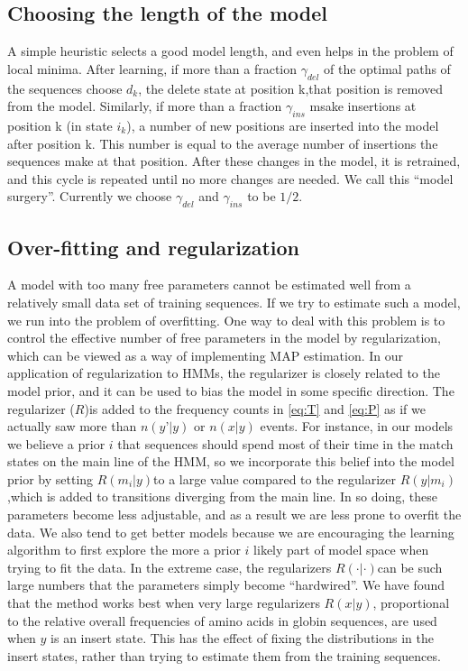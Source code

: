 \subsection{Choosing the length of the model}
A simple heuristic selects a good model length, and even helps in the problem of local minima. 
After learning, if more than a fraction $\gamma_{del}$ of the optimal paths of the sequences choose $d_k$, the delete state at position k,that position is removed from the model. 
Similarly, if more than a fraction $\gamma_{ins}$ msake insertions at position k (in state $i_k$), a number of new positions are inserted into the model after position k. This number is equal to the average number of insertions the sequences make at that position. After these changes in the model, it is retrained, and this cycle is repeated until no more changes are needed. We call this “model surgery”. Currently we choose $\gamma_{del}$ and $\gamma_{ins}$ to be $1/2$.

\subsection{Over-fitting and regularization}
A model with too many free parameters cannot be estimated well from a relatively small data set of training sequences. If we try to estimate such a model, we run into the problem of overfitting.
One way to deal with this problem is to control the effective number of free parameters in the model by regularization, which can be viewed as a way of implementing MAP estimation.
In our application of regularization to HMMs, the regularizer is closely related to the model prior, and it can be used to bias the model in some specific direction. The regularizer ($R$)is added to the frequency counts in \ref{eq:T} and  \ref{eq:P} as if we actually saw more than $n(y’|y)$ or $n(x|y)$ events. 
For instance, in our models we believe a prior $i$ that sequences should spend most of their time in the match states on the main line of the HMM, so we incorporate this belief into the model prior by setting $R(m_i|y)$to a large value compared to the regularizer $R(y|m_i)$,which is added to transitions diverging from the main line. 
In so doing, these parameters become less adjustable, and as a result we are less prone to overfit the data. 
We also tend to get better models because we are encouraging the learning algorithm to first explore the more a prior $i$ likely part of model space when trying to fit the data. 
In the extreme case, the regularizers $R(\cdot | \cdot)$can be such large numbers that the parameters simply become “hardwired”. We have found that the method works best when very large regularizers $R(x|y)$, proportional to the relative overall frequencies of amino acids in globin sequences, are used when $y$ is an insert state. This has the effect of fixing the distributions in the insert states, rather than trying to estimate them from the training sequences.


